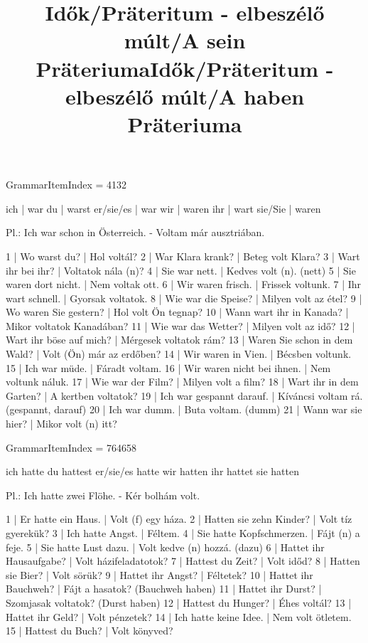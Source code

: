 \title{Idők/Präteritum - elbeszélő múlt/A sein Präteriuma}

GrammarItemIndex = 4132

\begin{desc}
ich       | war
du        | warst
er/sie/es | war
wir       | waren
ihr       | wart
sie/Sie   | waren

Pl.: Ich war schon in Österreich. - Voltam már ausztriában.
\end{desc}

\begin{exmp}
1 | Wo warst du? | Hol voltál?
2 | War Klara krank? | Beteg volt Klara?
3 | Wart ihr bei ihr? | Voltatok nála (n)?
4 | Sie war nett. | Kedves volt (n). (nett)
5 | Sie waren dort nicht. | Nem voltak ott.
6 | Wir waren frisch. | Frissek voltunk.
7 | Ihr wart schnell. | Gyorsak voltatok.
8 | Wie war die Speise? | Milyen volt az étel?
9 | Wo waren Sie gestern? | Hol volt Ön tegnap?
10 | Wann wart ihr in Kanada? | Mikor voltatok Kanadában?
11 | Wie war das Wetter? | Milyen volt az idő?
12 | Wart ihr böse auf mich? | Mérgesek voltatok rám?
13 | Waren Sie schon in dem Wald? | Volt (Ön) már az erdőben?
14 | Wir waren in Vien. | Bécsben voltunk.
15 | Ich war müde. | Fáradt voltam.
16 | Wir waren nicht bei ihnen. | Nem voltunk náluk.
17 | Wie war der Film? | Milyen volt a film?
18 | Wart ihr in dem Garten? | A kertben voltatok?
19 | Ich war gespannt darauf. | Kíváncsi voltam rá. (gespannt, darauf)
20 | Ich war dumm. | Buta voltam. (dumm)
21 | Wann war sie hier? | Mikor volt (n) itt?
\end{exmp}

\title{Idők/Präteritum - elbeszélő múlt/A haben Präteriuma}

GrammarItemIndex = 764658

\begin{desc}
ich hatte
du hattest
er/sie/es hatte
wir hatten
ihr hattet
sie hatten

Pl.: Ich hatte zwei Flöhe. - Kér bolhám volt.
\end{desc}

\begin{exmp}
1 | Er hatte ein Haus. | Volt (f) egy háza.
2 | Hatten sie zehn Kinder? | Volt tíz gyerekük?
3 | Ich hatte Angst. | Féltem.
4 | Sie hatte Kopfschmerzen. | Fájt (n) a feje.
5 | Sie hatte Lust dazu. | Volt kedve (n) hozzá. (dazu)
6 | Hattet ihr Hausaufgabe? | Volt házifeladatotok?
7 | Hattest du Zeit? | Volt időd?
8 | Hatten sie Bier? | Volt sörük?
9 | Hattet ihr Angst? | Féltetek?
10 | Hattet ihr Bauchweh? | Fájt a hasatok? (Bauchweh haben)
11 | Hattet ihr Durst? | Szomjasak voltatok? (Durst haben)
12 | Hattest du Hunger? | Éhes voltál?
13 | Hattet ihr Geld? | Volt pénzetek?
14 | Ich hatte keine Idee. | Nem volt ötletem.
15 | Hattest du Buch? | Volt könyved?
\end{exmp}

